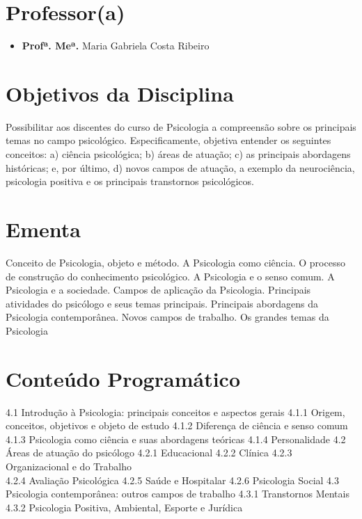 \documentclass[
]{book}
\providecommand{\tightlist}{%
  \setlength{\itemsep}{0pt}\setlength{\parskip}{0pt}}
\begin{document}
\hypertarget{professora-1}{%
\section{Professor(a)}\label{professora-1}}

\begin{itemize}
\tightlist
\item
  \textbf{Profª. Meª.} Maria Gabriela Costa Ribeiro
\end{itemize}

\hypertarget{objetivos-da-disciplina-1}{%
\section{Objetivos da Disciplina}\label{objetivos-da-disciplina-1}}

Possibilitar aos discentes do curso de Psicologia a compreensão sobre os principais temas no campo psicológico. Especificamente, objetiva entender os seguintes conceitos: a) ciência psicológica; b) áreas de atuação; c) as principais abordagens históricas; e, por último, d) novos campos de atuação, a exemplo da neurociência, psicologia positiva e os principais transtornos psicológicos.

\hypertarget{ementa-1}{%
\section{Ementa}\label{ementa-1}}

Conceito de Psicologia, objeto e método. A Psicologia como ciência. O processo de construção do conhecimento psicológico. A Psicologia e o senso comum. A Psicologia e a sociedade. Campos de aplicação da Psicologia. Principais atividades do psicólogo e seus temas principais. Principais abordagens da Psicologia contemporânea. Novos campos de trabalho. Os grandes temas da Psicologia

\hypertarget{conteuxfado-programuxe1tico-1}{%
\section{Conteúdo Programático}\label{conteuxfado-programuxe1tico-1}}

4.1 Introdução à Psicologia: principais conceitos e aspectos gerais
4.1.1 Origem, conceitos, objetivos e objeto de estudo
4.1.2 Diferença de ciência e senso comum
4.1.3 Psicologia como ciência e suas abordagens teóricas
4.1.4 Personalidade
4.2 Áreas de atuação do psicólogo
4.2.1 Educacional
4.2.2 Clínica
4.2.3 Organizacional e do Trabalho\\
4.2.4 Avaliação Psicológica
4.2.5 Saúde e Hospitalar
4.2.6 Psicologia Social
4.3 Psicologia contemporânea: outros campos de trabalho
4.3.1 Transtornos Mentais
4.3.2 Psicologia Positiva, Ambiental, Esporte e Jurídica
\end{document}
